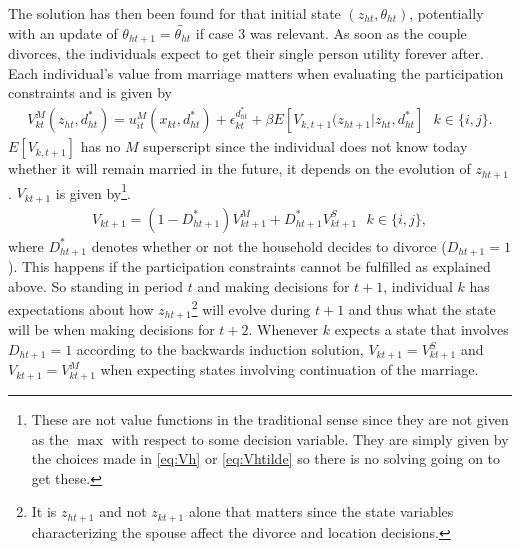 The solution has then been found for that initial state $(z_{ht},\theta_{ht})$, potentially with an update of $\theta_{ht+1}=\tilde{\theta_{ht}}$ if case 3 was relevant. As soon as the couple divorces, the individuals expect to get their single person utility forever after. Each individual's value from marriage matters when evaluating the participation constraints and is given by 
\begin{align}
V_{kt}^M(z_{ht},d_{ht}^*)=u_{it}^M(x_{kt},d_{ht}^*)+\epsilon_{kt}^{d_{ht}^*}+\beta E[V_{k,t+1}(z_{ht+1}|z_{ht},d_{ht}^*] \text{ $k\in\{i,j\}$}.
\label{eq:VkM}
\end{align}
$E[V_{k,t+1}]$ has no $M$ superscript since the individual does not know today whether it will remain married in the future, it depends on the evolution of $z_{ht+1}$. $V_{kt+1}$ is given by\footnote{These are not value functions in the traditional sense since they are not given as the $\max$ with respect to some decision variable. They are simply given by the choices made in \eqref{eq:Vh} or \eqref{eq:Vhtilde} so there is no solving going on to get these.}.
\begin{align}
V_{kt+1}=(1-D_{ht+1}^*)V_{kt+1}^M+D_{ht+1}^*V_{kt+1}^S \text{ }k\in\{i,j\},
\label{eq:Vi}
\end{align}
where $D_{ht+1}^*$ denotes whether or not the household decides to divorce ($D_{ht+1}=1$). This happens if the participation constraints cannot be fulfilled as explained above. So standing in period $t$ and making decisions for $t+1$, individual $k$ has expectations about how $z_{ht+1}$\footnote{It is $z_{ht+1}$ and not $z_{kt+1}$ alone that matters since the state variables characterizing the spouse affect the divorce and location decisions.} will evolve during $t+1$ and thus what the state will be when making decisions for $t+2$. Whenever $k$ expects a state that involves $D_{ht+1}=1$ according to the backwards induction solution, $V_{kt+1}=V_{kt+1}^S$ and $V_{kt+1}=V_{kt+1}^M$ when expecting states involving continuation of the marriage.


